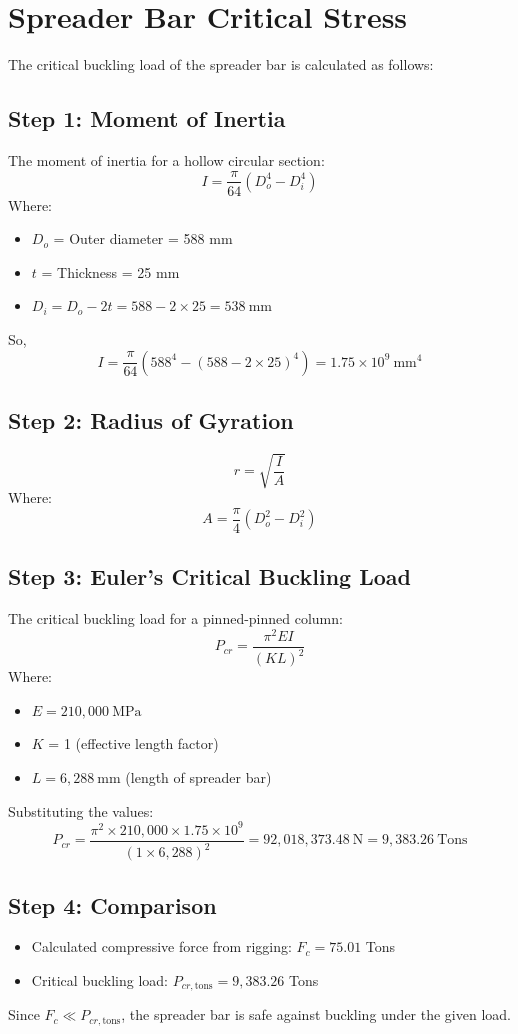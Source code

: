 \documentclass[12pt]{article}
\begin{document}
\section{Spreader Bar Critical Stress}
The critical buckling load of the spreader bar is calculated as follows:

\subsection*{Step 1: Moment of Inertia}
The moment of inertia for a hollow circular section:
\[
I = \frac{\pi}{64} (D_o^4 - D_i^4)
\]
Where:
\begin{itemize}
  \item $D_o$ = Outer diameter = 588 mm
  \item $t$ = Thickness = 25 mm
  \item $D_i = D_o - 2t = 588 - 2 \times 25 = 538\ \mathrm{mm}$
\end{itemize}
So,
\[
I = \frac{\pi}{64} (588^4 - (588-2 \times 25)^4) = 1.75 \times 10^9\ \mathrm{mm}^4
\]

\subsection*{Step 2: Radius of Gyration}
\[
r = \sqrt{\frac{I}{A}}
\]
Where:
\[
A = \frac{\pi}{4} (D_o^2 - D_i^2)
\]

\subsection*{Step 3: Euler's Critical Buckling Load}
The critical buckling load for a pinned-pinned column:
\[
P_{cr} = \frac{\pi^2 E I}{(K L)^2}
\]
Where:
\begin{itemize}
  \item $E = 210,000\ \mathrm{MPa}$
  \item $K$ = 1 (effective length factor)
  \item $L = 6,288\ \mathrm{mm}$ (length of spreader bar)
\end{itemize}
Substituting the values:
\[
P_{cr} = \frac{\pi^2 \times 210,000 \times 1.75 \times 10^9}{(1 \times 6,288)^2} = 92,018,373.48\ \mathrm{N} = 9,383.26\ \text{Tons}
\]

\subsection*{Step 4: Comparison}
\begin{itemize}
  \item Calculated compressive force from rigging: $F_c = 75.01$ Tons
  \item Critical buckling load: $P_{cr,\text{tons}} = 9,383.26$ Tons
\end{itemize}
Since $F_c \ll P_{cr,\text{tons}}$, the spreader bar is safe against buckling under the given load.
\end{document}
